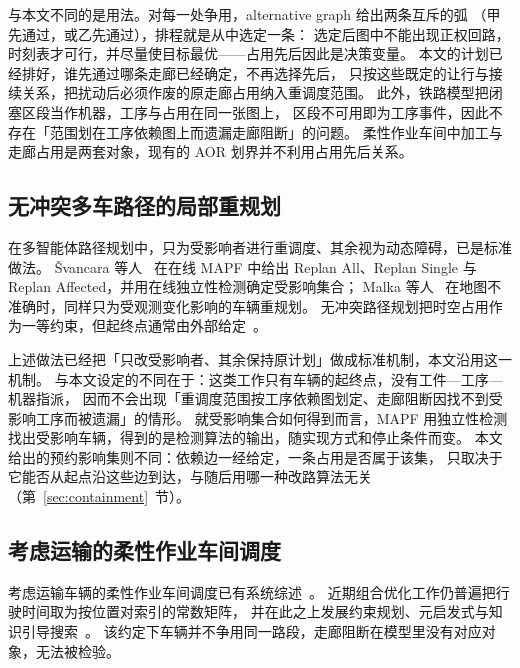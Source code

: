 与本文不同的是用法。对每一处争用，alternative graph 给出两条互斥的弧
（甲先通过，或乙先通过），排程就是从中选定一条：
选定后图中不能出现正权回路，时刻表才可行，并尽量使目标最优——占用先后因此是决策变量。
本文的计划已经排好，谁先通过哪条走廊已经确定，不再选择先后，
只按这些既定的让行与接续关系，把扰动后必须作废的原走廊占用纳入重调度范围。
此外，铁路模型把闭塞区段当作机器，工序与占用在同一张图上，
区段不可用即为工序事件，因此不存在「范围划在工序依赖图上而遗漏走廊阻断」的问题。
柔性作业车间中加工与走廊占用是两套对象，现有的 AOR 划界并不利用占用先后关系。

\subsection{无冲突多车路径的局部重规划}
\label{sec:rw_mapf}

在多智能体路径规划中，只为受影响者进行重调度、其余视为动态障碍，已是标准做法。
Švancara 等人~\cite{svancara2019online} 在在线 MAPF 中给出
Replan All、Replan Single 与 Replan Affected，并用在线独立性检测确定受影响集合；
Malka 等人~\cite{malka2024online} 在地图不准确时，同样只为受观测变化影响的车辆重规划。
无冲突路径规划把时空占用作为一等约束，但起终点通常由外部给定~\cite{zhang2024guidance}。

上述做法已经把「只改受影响者、其余保持原计划」做成标准机制，本文沿用这一机制。
与本文设定的不同在于：这类工作只有车辆的起终点，没有工件—工序—机器指派，
因而不会出现「重调度范围按工序依赖图划定、走廊阻断因找不到受影响工序而被遗漏」的情形。
就受影响集合如何得到而言，MAPF 用独立性检测找出受影响车辆，得到的是检测算法的输出，随实现方式和停止条件而变。
本文给出的预约影响集则不同：依赖边一经给定，一条占用是否属于该集，
只取决于它能否从起点沿这些边到达，与随后用哪一种改路算法无关
（第~\ref{sec:containment}~节）。

\subsection{考虑运输的柔性作业车间调度}
\label{sec:rw_position}

考虑运输车辆的柔性作业车间调度已有系统综述~\cite{xin2025review}。
近期组合优化工作仍普遍把行驶时间取为按位置对索引的常数矩阵，
并在此之上发展约束规划、元启发式与知识引导搜索~\cite{meng2025cp,qin2026knowledge,fu2025integrated}。
该约定下车辆并不争用同一路段，走廊阻断在模型里没有对应对象，无法被检验。

